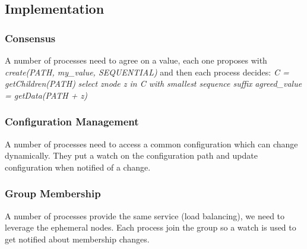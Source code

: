	\subsection{Implementation}
		\subsubsection{Consensus}
		A number of processes need to agree on a value, each one proposes with \textit{create(PATH, my\_value, SEQUENTIAL)} and then each process decides:\newline
		\textit{C = getChildren(PATH)}\newline
		\textit{select znode z in C with smallest sequence suffix}\newline
		\textit{agreed\_value = getData(PATH + z)}		\subsubsection{Configuration Management}
		A number of processes need to access a common configuration which can change dynamically.\newline
		They put a watch on the configuration path and update configuration when notified of a change.
		\subsubsection{Group Membership}
		A number of processes provide the same service (load balancing), we need to leverage the ephemeral nodes.\newline
		Each process join the group so a watch is used to get notified about membership changes.